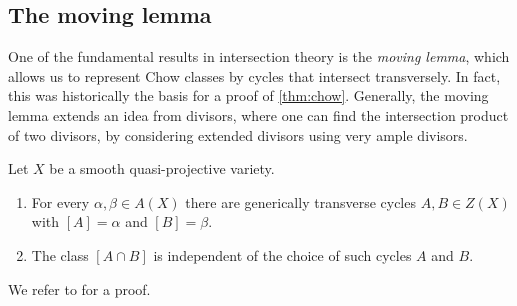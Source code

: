     
\subsection{The moving lemma}
One of the fundamental results in intersection theory is the \emph{moving lemma}, which allows us to represent Chow classes by cycles that intersect transversely. In fact, this was historically the basis for a proof of \cref{thm:chow}. Generally, the moving lemma extends an idea from divisors, where one can find the intersection product of two divisors, by considering extended divisors using very ample divisors. 

\begin{theorem}\label{thm:moving}
    Let $X$ be a smooth quasi-projective variety.
    \begin{enumerate}[label=(\alph*)]
        \item For every $\alpha, \beta \in A(X)$ there are generically transverse cycles $A, B \in Z(X)$ with $[A] = \alpha$ and $[B] = \beta$.
        \item The class $[A \cap B]$ is independent of the choice of such cycles $A$ and $B$.
    \end{enumerate}
\end{theorem}
We refer to \cite[Theorem 1.6]{EH16} for a proof.
